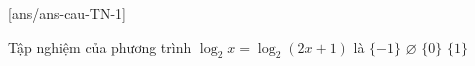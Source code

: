 
\caulc
{}[ans/ans-cau-TN-1]

\begin{ex}%
	Tập nghiệm của phương trình $\log_2x=\log_2(2x+1)$ là 
	\choice
	{$\{-1\}$}
	{\True $\varnothing$}
	{$\{0\}$}
	{$\{1\}$}
\end{ex}

